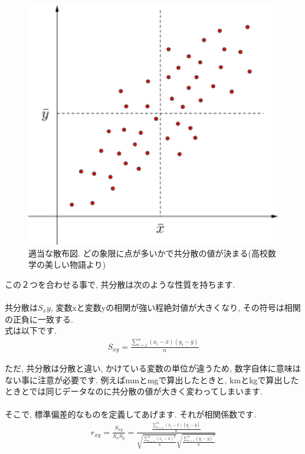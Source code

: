 \documentclass[11pt,a4paper]{jreport}
\begin{document}
\begin{figure}[H]
\label{im:co-var}
  \centering
  \includegraphics[width=120mm,bb=0 0 432 288]{figures/kyoubunnsann.png}
  \caption{適当な散布図. どの象限に点が多いかで共分散の値が決まる(高校数学の美しい物語より)}
\end{figure}

この２つを合わせる事で, 共分散は次のような性質を持ちます.\\
\\
共分散は$S_xy$, 変数xと変数yの相関が強い程絶対値が大きくなり, その符号は相関の正負に一致する.
\\
式は以下です.\\
\begin{eqnarray}
\label{eq:covar}
S_{xy} = \frac{\sum_{i=1}^{n} (x_i - \bar{x})(y_i - \bar{y})}{n}
\end{eqnarray}

ただ, 共分散は分散と違い, かけている変数の単位が違うため, 数字自体に意味はない事に注意が必要です. 例えばmmとmgで算出したときと, kmとkgで算出したときとでは同じデータなのに共分散の値が大きく変わってしまいます.\\
\\
そこで, 標準偏差的なものを定義してあげます. それが相関係数です.\\

\begin{eqnarray}
r_{xy} = \frac{S_{xy}}{S_x S_y} = \frac{\frac{\sum_{i=1}^{n} (x_i - \bar{x})(y_i - \bar{y})}{n}}{\sqrt{\frac{\sum_{i=1}^{n} (x_i - \bar{x})^2}{n}} \sqrt{\frac{\sum_{i=1}^{n} (y_i - \bar{y})^2}{n}}}
\end{eqnarray}
\end{document}

